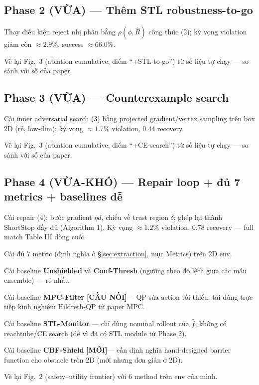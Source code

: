 \documentclass[a4paper,12pt]{article}
\newcommand{\new}{\textcolor{red!60!black}{\textbf{[MỚI]}}}
\newcommand{\bridge}{\textcolor{blue!50!black}{\textbf{[CẦU NỐI]}}}
\begin{document}
\subsection{Phase 2 (VỪA) --- Thêm STL robustness-to-go}
\begin{tasklist}
  \item[\square] Thay điều kiện reject nhị phân bằng $\rho(\phi,\hat R)$ công thức (2); kỳ vọng violation giảm còn $\approx 2.9\%$, success $\approx 66.0\%$.
  \item[\square] Vẽ lại Fig.~3 (ablation cumulative, điểm ``+STL-to-go'') từ số liệu tự chạy — so sánh với số của paper.
\end{tasklist}

\subsection{Phase 3 (VỪA) --- Counterexample search}
\begin{tasklist}
  \item[\square] Cài inner adversarial search (3) bằng projected gradient/vertex sampling trên box 2D (rẻ, low-dim); kỳ vọng $\approx 1.7\%$ violation, $0.44$ recovery.
  \item[\square] Vẽ lại Fig.~3 (ablation cumulative, điểm ``+CE-search'') từ số liệu tự chạy — so sánh với số của paper.
\end{tasklist}

\subsection{Phase 4 (VỪA-KHÓ) --- Repair loop + đủ 7 metrics + baselines dễ}
\begin{tasklist}
  \item[\square] Cài repair (4): bước gradient $\eta d$, chiếu về trust region $\delta$; ghép lại thành ShortStop đầy đủ (Algorithm 1). Kỳ vọng $\approx 1.2\%$ violation, $0.78$ recovery — full match Table III dòng cuối.
  \item[\square] Cài đủ 7 metric (định nghĩa ở \S\ref{sec:extraction}, mục Metrics) trên 2D env.
  \item[\square] Cài baseline \textbf{Unshielded} và \textbf{Conf-Thresh} (ngưỡng theo độ lệch giữa các mẫu ensemble) — rẻ nhất.
  \item[\square] Cài baseline \textbf{MPC-Filter} \bridge — QP sửa action tối thiểu; tái dùng trực tiếp kinh nghiệm Hildreth-QP từ paper MPC.
  \item[\square] Cài baseline \textbf{STL-Monitor} — chỉ dùng nominal rollout của $\hat f$, không có reachtube/CE search (dễ vì đã có STL module từ Phase 2).
  \item[\square] Cài baseline \textbf{CBF-Shield} \new — cần định nghĩa hand-designed barrier function cho obstacle tròn 2D (mới nhưng đơn giản ở 2D).
  \item[\square] Vẽ lại Fig.~2 (safety--utility frontier) với 6 method trên env của mình.
\end{tasklist}
\end{document}
